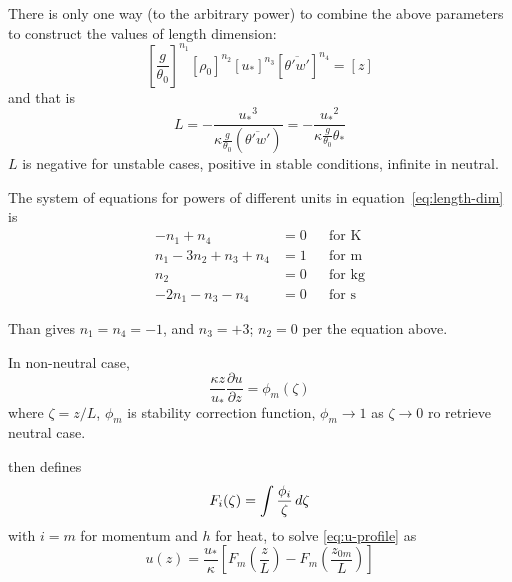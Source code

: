 \documentclass{article}
\newcommand{\pderiv}[2]{\frac{\partial #1}{\partial #2}} %
\newcommand{\vonkarman}{\kappa} %
\newcommand{\pt}{\theta} %
\newcommand{\ustar}{\ensuremath{u_*}} %
\newcommand{\tstar}{\ensuremath{\pt_*}} %
\newcommand{\zm}{z_{0m}} %
\newcommand{\fstab}{\phi} %
\begin{document}
There is only one way (to the arbitrary power) to combine the above parameters to construct the values of length dimension:
\begin{equation}\label{eq:length-dim}
    \left[\frac{g}{\pt_0}\right]^{n_1}
    \left[\rho_0\right]^{n_2}
    \left[\ustar\right]^{n_3}
    \left[\overline{\pt'w'}\right]^{n_4} = [z]
\end{equation}
and that is
\begin{equation}
   L = - \frac{\ustar^3}{\vonkarman\frac{g}{\pt_0}(\overline{\pt'w'})}
     = - \frac{\ustar^2}{\vonkarman\frac{g}{\pt_0}\tstar}
\end{equation}
%
$L$ is negative for unstable cases, positive in stable conditions, infinite in neutral.
\begin{mdframed}
The system of equations for powers of different units in equation~\eqref{eq:length-dim} is
\begin{subequations}
\begin{align}
 -n_1 + n_4 &= 0              & & \text{for }\si{\K}\\
 n_1 - 3 n_2 + n_3 + n_4 &= 1 & & \text{for }\si{\m}\\
 n_2 &= 0                     & & \text{for }\si{\kg}\\
 -2 n_1 - n_3 -n_4 &= 0       & & \text{for }\si{\s}
\end{align}
\end{subequations}

Than gives $n_1 = n_4 = -1$, and $n_3 = +3$; $n_2 = 0$ per the equation above.
\end{mdframed}
In non-neutral case,
\begin{equation}\label{eq:u-profile}
   \frac{\vonkarman z}{\ustar}\pderiv{u}{z} = \fstab_m(\zeta)
\end{equation}
where
$\zeta=z/L$,
$\fstab_m$ is stability correction function,
$\fstab_m \to 1$ as $\zeta \to 0$ ro retrieve neutral case.

\cite{Held2004} then defines
\label{eq:Held-integral}
\begin{equation}
   F_i(\zeta) = \int\frac{\fstab_i}{\zeta}\,d \zeta \\
\end{equation}
with $i=m$ for momentum and $h$ for heat, to solve \eqref{eq:u-profile} as
\begin{equation}
   u(z) = \frac{\ustar}{\vonkarman} \left[
          F_m\left(\frac{z}{L}\right)-F_m\left(\frac{\zm}{L}\right)
      \right]
\end{equation}
\end{document}
